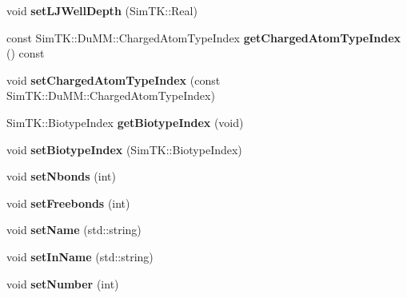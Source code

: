\begin{DoxyCompactItemize}
\item 
void {\bfseries set\+L\+J\+Well\+Depth} (Sim\+T\+K\+::\+Real)\hypertarget{classbSpecificAtom_a59f0a8a12c9a0d00567fc3b4c32988bf}{}\label{classbSpecificAtom_a59f0a8a12c9a0d00567fc3b4c32988bf}

\item 
const Sim\+T\+K\+::\+Du\+M\+M\+::\+Charged\+Atom\+Type\+Index {\bfseries get\+Charged\+Atom\+Type\+Index} () const \hypertarget{classbSpecificAtom_a9204dbe102e5a0ceb87e065505fa5104}{}\label{classbSpecificAtom_a9204dbe102e5a0ceb87e065505fa5104}

\item 
void {\bfseries set\+Charged\+Atom\+Type\+Index} (const Sim\+T\+K\+::\+Du\+M\+M\+::\+Charged\+Atom\+Type\+Index)\hypertarget{classbSpecificAtom_a24add05d0dea25ae981229af8a6ea5d1}{}\label{classbSpecificAtom_a24add05d0dea25ae981229af8a6ea5d1}

\item 
Sim\+T\+K\+::\+Biotype\+Index {\bfseries get\+Biotype\+Index} (void)\hypertarget{classbSpecificAtom_ae790b9da1c5f4e50737b0ab59f964060}{}\label{classbSpecificAtom_ae790b9da1c5f4e50737b0ab59f964060}

\item 
void {\bfseries set\+Biotype\+Index} (Sim\+T\+K\+::\+Biotype\+Index)\hypertarget{classbSpecificAtom_a56cd4bccfe7c53e498d01f62af531176}{}\label{classbSpecificAtom_a56cd4bccfe7c53e498d01f62af531176}

\item 
void {\bfseries set\+Nbonds} (int)\hypertarget{classbSpecificAtom_a917a66f70320b54e3e677825670a349a}{}\label{classbSpecificAtom_a917a66f70320b54e3e677825670a349a}

\item 
void {\bfseries set\+Freebonds} (int)\hypertarget{classbSpecificAtom_a2738fb5c732fb1bdbcd2c819bc278168}{}\label{classbSpecificAtom_a2738fb5c732fb1bdbcd2c819bc278168}

\item 
void {\bfseries set\+Name} (std\+::string)\hypertarget{classbSpecificAtom_a39570f8baa110ff2091e13a09a16a81f}{}\label{classbSpecificAtom_a39570f8baa110ff2091e13a09a16a81f}

\item 
void {\bfseries set\+In\+Name} (std\+::string)\hypertarget{classbSpecificAtom_a7f4a01eb83ed6dd1fc3665f8b7f8479e}{}\label{classbSpecificAtom_a7f4a01eb83ed6dd1fc3665f8b7f8479e}

\item 
void {\bfseries set\+Number} (int)\hypertarget{classbSpecificAtom_a2cf28740f5621986fe380319b0d37127}{}\label{classbSpecificAtom_a2cf28740f5621986fe380319b0d37127}


\end{DoxyCompactItemize}
